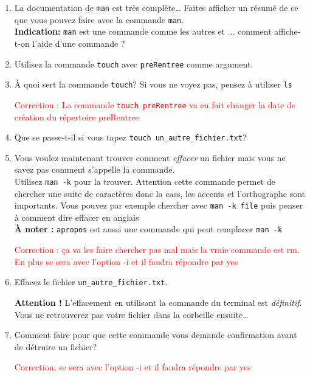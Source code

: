 \documentclass{article}
\begin{document}
\begin{exercice}

\begin{enumerate}
\def\labelenumi{\arabic{enumi}.}
\item
  La documentation de \texttt{man} est très complète\ldots{} Faites afficher un résumé
  de ce que vous pouvez faire avec la commande \texttt{man}.\\
  \textbf{Indication: }\texttt{man} est une commande comme les autres et ... comment affiche-t-on l'aide d'une commande ?
\item
  Utilisez la commande \texttt{touch} avec \texttt{preRentree} comme argument.
\item
  À quoi sert la commande \texttt{touch}? Si vous ne voyez pas, pensez à
  utiliser \texttt{ls}
  
   \textcolor{red}{Correction : La commande \texttt{touch preRentree} va en fait changer la date de création du répertoire preRentree}


\item
  Que se passe-t-il si vous tapez \texttt{touch\ un\_autre\_fichier.txt}?
\item
  Vous voulez maintenant trouver comment \emph{effacer} un fichier mais
  vous ne savez pas comment s'appelle la commande. \\
  Utilisez \texttt{man\ -k} pour la trouver. Attention cette commande permet de chercher
  une suite de caractères donc la cass, les accents et l'orthographe
  sont importants.
  Vous pouvez par exemple chercher  avec \texttt{man -k file} puis penser à comment dire effacer en anglais \\
  \textbf{À noter : }\texttt{apropos} est aussi une commande qui peut remplacer \texttt{man -k}

\textcolor{red}{Correction : \c ca va les faire chercher pas mal mais la vraie commande est rm.
En plus se sera avec l'option -i et il faudra répondre par yes}

\item
  Effacez le fichier \texttt{un\_autre\_fichier.txt}.

  \textbf{Attention !} L'effacement en utilisant la commande du terminal
  est \emph{définitif}. Vous ne retrouverez pas votre fichier dans la
  corbeille ensuite\ldots{}
\item
  Comment faire pour que cette commande vous demande confirmation avant
  de détruire un fichier?

\textcolor{red}{Correction: se sera avec l'option -i et il faudra répondre par yes}

\end{enumerate}

\end{exercice}
\end{document}
